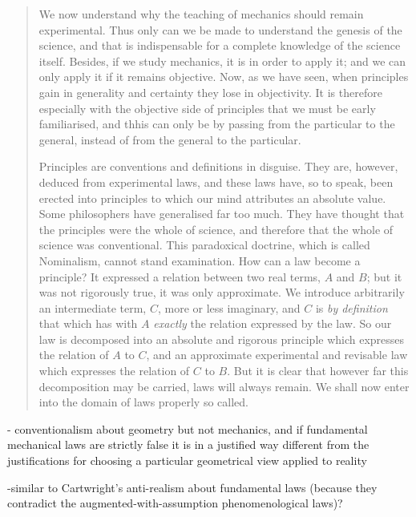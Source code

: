  \begin{quote}
     We now understand why the teaching of mechanics should remain experimental.  Thus only can we be made to understand the genesis of the science, and that is indispensable for a complete knowledge of the science itself.  Besides, if we study mechanics, it is in order to apply it; and we can only apply it if it remains objective.  Now, as we have seen, when principles gain in generality and certainty they lose in objectivity.  It is therefore especially with the objective side of principles that we must be early familiarised, and thhis can only be by passing from the particular to the general, instead of from the general to the particular.
     
     Principles are conventions and definitions in disguise.  They are, however, deduced from experimental laws, and these laws have, so to speak, been erected into principles to which our mind attributes an absolute value.  Some philosophers have generalised far too much.  They have thought that the principles were the whole of science, and therefore that the whole of science was conventional.  This paradoxical doctrine, which is called Nominalism, cannot stand examination.  How can a law become a principle?  It expressed a relation between two real terms, $A$ and $B$; but it was not rigorously true, it was only approximate.  We introduce arbitrarily an intermediate term, $C$, more or less imaginary, and $C$ is \emph{by definition} that which has with $A$ \emph{exactly} the relation expressed by the law.  So our law is decomposed into an absolute and rigorous principle which expresses the relation of $A$ to $C$, and an approximate experimental and revisable law which expresses the relation of $C$ to $B$.  But it is clear that however far this decomposition may be carried, laws will always remain.  We shall now enter into the domain of laws properly so called.  \citep[p. 138-139]{Poincare1952}
 \end{quote}
 
 - conventionalism about geometry but not mechanics, and if fundamental mechanical laws are strictly false it is in a justified way different from the justifications for choosing a particular geometrical view applied to reality
 
 -similar to Cartwright's anti-realism about fundamental laws (because they contradict the augmented-with-assumption phenomenological laws)?
 
